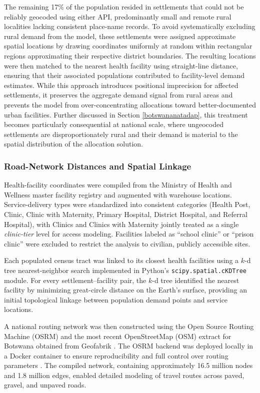 \documentclass{article}
\begin{document}
The remaining 17\% of the population resided in settlements that could not be reliably geocoded using either API, predominantly small and remote rural localities lacking consistent place-name records. To avoid systematically excluding rural demand from the model, these settlements were assigned approximate spatial locations by drawing coordinates uniformly at random within rectangular regions approximating their respective district boundaries. The resulting locations were then matched to the nearest health facility using straight-line distance, ensuring that their associated populations contributed to facility-level demand estimates. While this approach introduces positional imprecision for affected settlements, it preserves the aggregate demand signal from rural areas and prevents the model from over-concentrating allocations toward better-documented urban facilities. Further discussed in Section \ref{botswananatadap}, this treatment becomes particularly consequential at national scale, where ungeocoded settlements are disproportionately rural and their demand is material to the spatial distribution of the allocation solution.

\subsubsection{Road-Network Distances and Spatial Linkage}
\label{3.1.4}

Health-facility coordinates were compiled from the Ministry of Health and Wellness master facility registry and augmented with warehouse locations. Service-delivery types were standardized into consistent categories (Health Post, Clinic, Clinic with Maternity, Primary Hospital, District Hospital, and Referral Hospital), with Clinics and Clinics with Maternity jointly treated as a single \textit{clinic-tier} level for access modeling. Facilities labeled as ``school clinic'' or ``prison clinic'' were excluded to restrict the analysis to civilian, publicly accessible sites.

Each populated census tract was linked to its closest health facilities using a $k$-d tree nearest-neighbor search implemented in Python’s \texttt{scipy.spatial.cKDTree} module. For every settlement–facility pair, the $k$-d tree identified the nearest facility by minimizing great-circle distance on the Earth's surface, providing an initial topological linkage between population demand points and service locations.

A national routing network was then constructed using the Open Source Routing Machine (OSRM) and the most recent OpenStreetMap (OSM) extract for Botswana obtained from Geofabrik \cite{geofabrik}. The OSRM backend was deployed locally in a Docker container to ensure reproducibility and full control over routing parameters \cite{osrm}. The compiled network, containing approximately 16.5 million nodes and 1.8 million edges, enabled detailed modeling of travel routes across paved, gravel, and unpaved roads.
\end{document}

